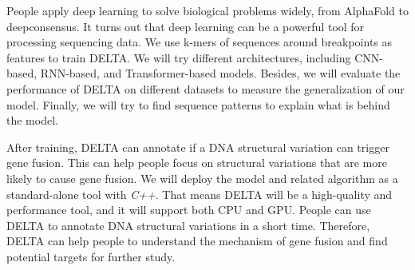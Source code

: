 \documentclass{article}
\begin{document}
People apply deep learning to solve biological problems widely, from AlphaFold to deepconsensus.
It turns out that deep learning can be a powerful tool for processing sequencing data.
We use k-mers of sequences around breakpoints as features to train DELTA\@.
We will try different architectures, including CNN-based, RNN-based, and Transformer-based models.
Besides, we will evaluate the performance of DELTA on different datasets to measure the generalization of our model.
Finally, we will try to find sequence patterns to explain what is behind the model.

After training, DELTA can annotate if a DNA structural variation can trigger gene fusion.
This can help people focus on structural variations that are more likely to cause gene fusion.
We will deploy the model and related algorithm as a standard-alone tool with \textit{C++}.
That means DELTA will be a high-quality and performance tool, and it will support both CPU and GPU\@.
People can use DELTA to annotate DNA structural variations in a short time.
Therefore, DELTA can help people to understand the mechanism of gene fusion and find potential targets for further study.






% 
% 
\end{document}
